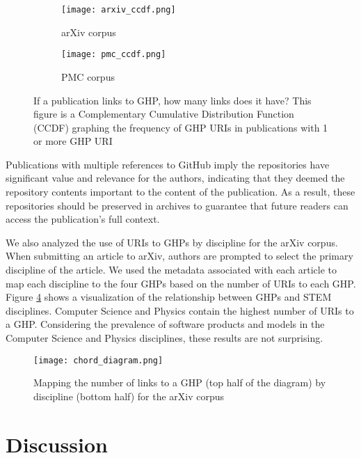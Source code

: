 \begin{figure}[htbp]
\centering
\begin{subfigure}{\textwidth}
    \texttt{[image: arxiv\_ccdf.png]}
    \caption{arXiv corpus}
    \label{fig:arxiv_ccdf}
\end{subfigure}
\hfill
\begin{subfigure}{\textwidth}
    \texttt{[image: pmc\_ccdf.png]}
    \caption{PMC corpus}
    \label{fig:pmc_ccdf}
\end{subfigure}
        
\caption{If a publication links to GHP, how many links does it have? This figure is a Complementary Cumulative Distribution Function (CCDF) graphing the frequency of GHP URIs in publications with 1 or more GHP URI}
\label{fig:ccdf}
\end{figure}

Publications with multiple references to GitHub imply the repositories have significant value and relevance for the authors, indicating that they deemed the repository contents important to the content of the publication. As a result, these repositories should be preserved in archives to guarantee that future readers can access the publication's full context.

We also analyzed the use of URIs to GHPs by discipline for the arXiv corpus. When submitting an article to arXiv, authors are prompted to select the primary discipline of the article. We used the metadata associated with each article to map each discipline to the four GHPs based on the number of URIs to each GHP. Figure \ref{fig:chord_diagram} shows a visualization of the relationship between GHPs and STEM disciplines. Computer Science and Physics contain the highest number of URIs to a GHP. Considering the prevalence of software products and models in the Computer Science and Physics disciplines, these results are not surprising.

\begin{figure}
    \centering
    \texttt{[image: chord\_diagram.png]}
    \caption{Mapping the number of links to a GHP (top half of the diagram) by discipline (bottom half) for the arXiv corpus}
    \label{fig:chord_diagram}
\end{figure}

\section{Discussion}

